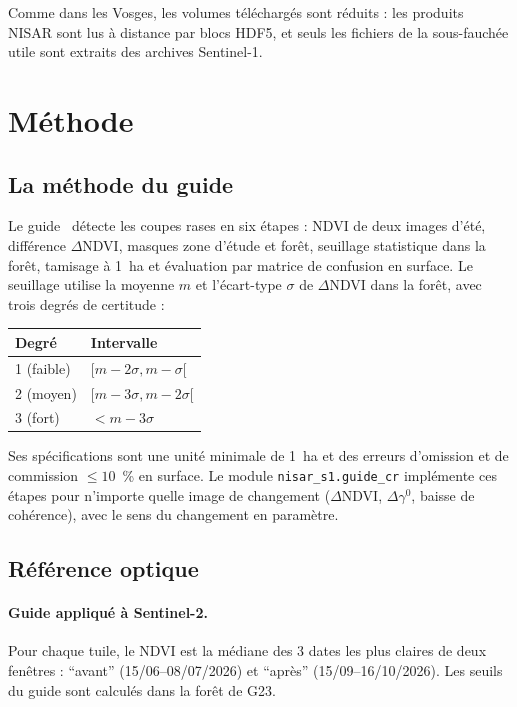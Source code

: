 Comme dans les Vosges, les volumes téléchargés sont réduits : les produits NISAR sont lus à distance par blocs
HDF5, et seuls les fichiers de la sous-fauchée utile sont extraits des archives Sentinel-1.

\section{Méthode}

\subsection{La méthode du guide}

Le guide~\cite{ose2015guide} détecte les coupes rases en six étapes : NDVI de deux images d'été, différence
$\Delta$NDVI, masques zone d'étude et forêt, seuillage statistique dans la forêt, tamisage à 1~ha et évaluation par
matrice de confusion en surface. Le seuillage utilise la moyenne $m$ et l'écart-type $\sigma$ de $\Delta$NDVI
dans la forêt, avec trois degrés de certitude :
\begin{center}\small
\begin{tabular}{ll}
\toprule
Degré & Intervalle \\
\midrule
1 (faible) & $[m-2\sigma, m-\sigma[$ \\
2 (moyen) & $[m-3\sigma, m-2\sigma[$ \\
3 (fort) & $< m-3\sigma$ \\
\bottomrule
\end{tabular}
\end{center}
Ses spécifications sont une unité minimale de 1~ha et des erreurs d'omission et de commission $\leq 10$~\% en
surface. Le module \texttt{nisar\_s1.guide\_cr} implémente ces étapes pour n'importe quelle image de changement
($\Delta$NDVI, $\Delta\gamma^0$, baisse de cohérence), avec le sens du changement en paramètre.

\subsection{Référence optique}

\paragraph{Guide appliqué à Sentinel-2.} Pour chaque tuile, le NDVI est la médiane des 3 dates les plus claires de
deux fenêtres : \enquote{avant} (15/06--08/07/2026) et \enquote{après} (15/09--16/10/2026). Les seuils du guide
sont calculés dans la forêt de G23.

